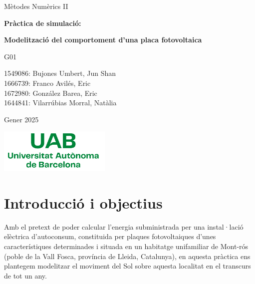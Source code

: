 \documentclass[10pt, twoside, a4paper]{article}
\begin{document}
\begin{titlepage}
\centering
{\LARGE Mètodes Numèrics II \par}
\vspace{2cm}
{\Huge \textbf{Pràctica de simulació:} \par}
\vspace{1cm}
{\Huge \textbf{Modelització del comportoment d'una placa fotovoltaica} \par}
\vspace{3cm}
{\Large G01 \par}
\vspace{0.5cm}
{\Large 1549086: Bujones Umbert, Jun Shan\\1666739: Franco Avilés, Eric\\  1672980: González Barea, Eric\\1644841: Vilarrúbias Morral, Natàlia \par}
\vspace{2cm}
{\Large Gener 2025 \par}
\vspace{2cm}
\includegraphics[width=0.4\textwidth]{Logo_UAB.png}


\end{titlepage}

\renewcommand{\cftsecfont}{}
\renewcommand{\cftsecpagefont}{}
\renewcommand{\cftsecleader}{\cftdotfill{\cftdotsep}}
\renewcommand{\cftdotsep}{0.2}
\setlength{\cftbeforesecskip}{0.5em}
\setlength{\cftbeforesubsecskip}{0.5em}
\tableofcontents

\newpage
{}
\setcounter{page}{1}

\pagestyle{fancy}

\section{Introducció i objectius}
Amb el pretext de poder calcular l'energia subministrada per una instal·lació elèctrica d'autoconsum, constituida per plaques fotovoltaiques d'unes característiques determinades i situada en un habitatge unifamiliar de Mont-rós (poble de la Vall Fosca, província de Lleida, Catalunya), en aquesta pràctica ens plantegem modelitzar el moviment del Sol sobre aquesta localitat en el transcurs de tot un any. 
\end{document}
